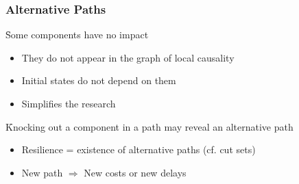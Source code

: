 
\begin{frame}
\frametitle{Alternative Paths}


\pause
\bigskip
\f Some components have no impact
\begin{itemize}
  \item They do not appear in the graph of local causality
  \item Initial states do not depend on them
  \item Simplifies the research
\end{itemize}

\pause
\bigskip
\f Knocking out a component in a path may reveal an alternative path
\begin{itemize}
  \item Resilience = existence of alternative paths (cf. cut sets)
  \item New path $\Rightarrow$ New costs or new delays
\end{itemize}

\end{frame}
